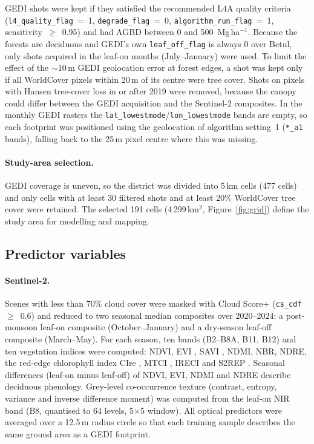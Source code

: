 \documentclass[11pt,a4paper]{article}
\newcommand{\mgha}{Mg\,ha$^{-1}$}
\begin{document}
GEDI shots were kept if they satisfied the recommended L4A quality criteria
(\texttt{l4\_quality\_flag}~=~1, \texttt{degrade\_flag}~=~0,
\texttt{algorithm\_run\_flag}~=~1, sensitivity~$\geq$~0.95) and had AGBD between 0 and
500~\mgha{}. Because the forests are deciduous and GEDI's own \texttt{leaf\_off\_flag} is
always 0 over Betul, only shots acquired in the leaf-on months (July--January) were used. To
limit the effect of the $\sim$10\,m GEDI geolocation error at forest edges, a shot was kept
only if all WorldCover pixels within 20\,m of its centre were tree cover. Shots on pixels with
Hansen tree-cover loss in or after 2019 were removed, because the canopy could differ between
the GEDI acquisition and the Sentinel-2 composites. In the monthly GEDI rasters the
\texttt{lat\_lowestmode}/\texttt{lon\_lowestmode} bands are empty, so each footprint was
positioned using the geolocation of algorithm setting~1 (\texttt{*\_a1} bands), falling back
to the 25\,m pixel centre where this was missing.

\paragraph{Study-area selection.} GEDI coverage is uneven, so the district was divided into
5\,km cells (477 cells) and only cells with at least 30 filtered shots and at least 20\%
WorldCover tree cover were retained. The selected 191 cells (4\,299\,km$^2$,
Figure~\ref{fig:grid}) define the study area for modelling and mapping.

\subsection{Predictor variables}

\paragraph{Sentinel-2.} Scenes with less than 70\% cloud cover were masked with Cloud Score+
(\texttt{cs\_cdf}~$\geq$~0.6) and reduced to two seasonal median composites over 2020--2024:
a post-monsoon leaf-on composite (October--January) and a dry-season leaf-off composite
(March--May). For each season, ten bands (B2--B8A, B11, B12) and ten vegetation indices were
computed: NDVI, EVI \citep{huete2002}, SAVI \citep{huete1988}, NDMI, NBR, NDRE, the red-edge
chlorophyll index CIre \citep{gitelson2003}, MTCI \citep{dash2004}, IRECI and S2REP
\citep{frampton2013}. Seasonal differences (leaf-on minus leaf-off) of NDVI, EVI, NDMI and
NDRE describe deciduous phenology. Grey-level co-occurrence texture \citep{haralick1973}
(contrast, entropy, variance and inverse difference moment) was computed from the leaf-on NIR
band (B8, quantised to 64 levels, 5$\times$5 window). All optical predictors were averaged over
a 12.5\,m radius circle so that each training sample describes the same ground area as a
GEDI footprint.
\end{document}
